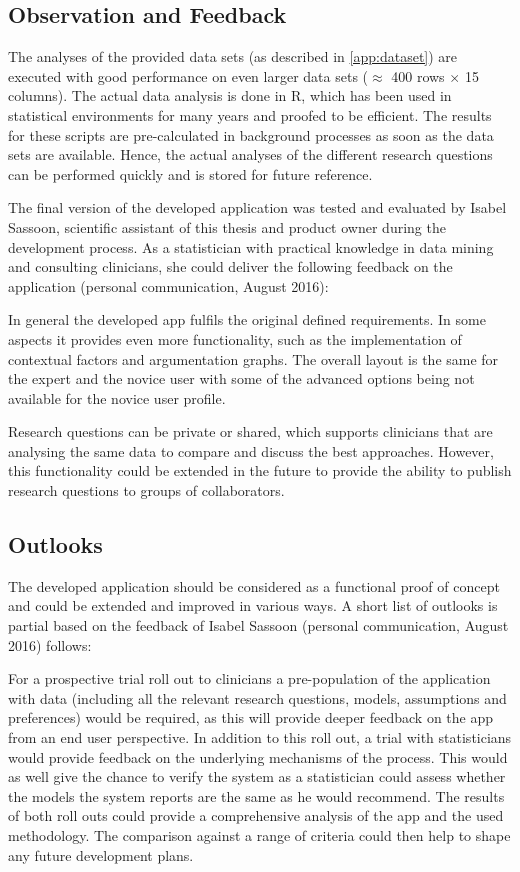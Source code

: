 \subsection{Observation and Feedback}
\sloppy

The analyses of the provided data sets (as described in \autoref{app:dataset}) are executed with good performance on even larger data sets ($\approx$ 400 rows $\times$ 15 columns). The actual data analysis is done in \gls{R}, which has been used in statistical environments for many years and proofed to be efficient. The results for these scripts are pre-calculated in background processes as soon as the data sets are available. Hence, the actual analyses of the different research questions can be performed quickly and is stored for future reference.

The final version of the developed application was tested and evaluated by Isabel Sassoon, scientific assistant of this thesis and product owner during the development process. As a statistician with practical knowledge in data mining and consulting clinicians, she could deliver the following feedback on the application (personal communication, August 2016):

In general the developed app fulfils the original defined requirements. In some aspects it provides even more functionality, such as the implementation of contextual factors and argumentation graphs. The overall layout is the same for the expert and the novice user with some of the advanced options being not available for the novice user profile.

Research questions can be private or shared, which supports clinicians that are analysing the same data to compare and discuss the best approaches. However, this functionality could be extended in the future to provide the ability to publish research questions to groups of collaborators.


\subsection{Outlooks}
\label{sub:outlooks}

The developed application should be considered as a functional proof of concept and could be extended and improved in various ways. A short list of outlooks is partial based on the feedback of Isabel Sassoon (personal communication, August 2016) follows:

For a prospective trial roll out to clinicians a pre-population of the application with data (including  all the relevant research questions, models, assumptions and preferences) would be required, as this will provide deeper feedback on the app from an end user perspective. In addition to this roll out, a trial with statisticians would provide feedback on the underlying mechanisms of the process. This would as well give the chance to verify the system as a statistician could assess whether the models the system reports are the same as he would recommend. The results of both roll outs could provide a comprehensive analysis of the app and the used methodology. The comparison against a range of criteria could then help to shape any future development plans.

